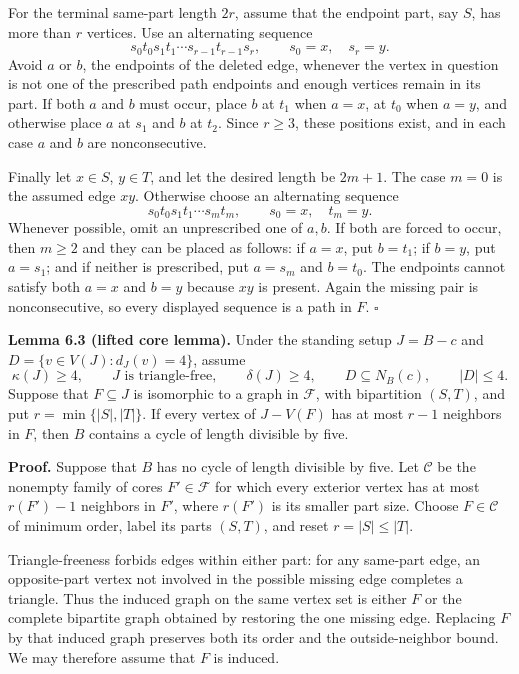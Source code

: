 \documentclass[
  11pt]{article}
\begin{document}
For the terminal same-part length \(2r\), assume that the endpoint part,
say \(S\), has more than \(r\) vertices. Use an alternating sequence \[
 s_0t_0s_1t_1\cdots s_{r-1}t_{r-1}s_r,
 \qquad s_0=x,\quad s_r=y.
\] Avoid \(a\) or \(b\), the endpoints of the deleted edge, whenever the
vertex in question is not one of the prescribed path endpoints and
enough vertices remain in its part. If both \(a\) and \(b\) must occur,
place \(b\) at \(t_1\) when \(a=x\), at \(t_0\) when \(a=y\), and
otherwise place \(a\) at \(s_1\) and \(b\) at \(t_2\). Since \(r\ge3\),
these positions exist, and in each case \(a\) and \(b\) are
nonconsecutive.

Finally let \(x\in S\), \(y\in T\), and let the desired length be
\(2m+1\). The case \(m=0\) is the assumed edge \(xy\). Otherwise choose
an alternating sequence \[
 s_0t_0s_1t_1\cdots s_mt_m,
 \qquad s_0=x,\quad t_m=y.
\] Whenever possible, omit an unprescribed one of \(a,b\). If both are
forced to occur, then \(m\ge2\) and they can be placed as follows: if
\(a=x\), put \(b=t_1\); if \(b=y\), put \(a=s_1\); and if neither is
prescribed, put \(a=s_m\) and \(b=t_0\). The endpoints cannot satisfy
both \(a=x\) and \(b=y\) because \(xy\) is present. Again the missing
pair is nonconsecutive, so every displayed sequence is a path in \(F\).
\(\square\)

\textbf{Lemma 6.3 (lifted core lemma).} Under the standing setup
\(J=B-c\) and \(D=\{v\in V(J):d_J(v)=4\}\), assume \[
 \kappa(J)\ge4,
 \qquad J\text{ is triangle-free},
 \qquad \delta(J)\ge4,
 \qquad D\subseteq N_B(c),
 \qquad |D|\le4.
\] Suppose that \(F\subseteq J\) is isomorphic to a graph in
\(\mathcal F\), with bipartition \((S,T)\), and put
\(r=\min\{|S|,|T|\}\). If every vertex of \(J-V(F)\) has at most \(r-1\)
neighbors in \(F\), then \(B\) contains a cycle of length divisible by
five.

\textbf{Proof.} Suppose that \(B\) has no cycle of length divisible by
five. Let \(\mathcal C\) be the nonempty family of cores
\(F'\in\mathcal F\) for which every exterior vertex has at most
\(r(F')-1\) neighbors in \(F'\), where \(r(F')\) is its smaller part
size. Choose \(F\in\mathcal C\) of minimum order, label its parts
\((S,T)\), and reset \(r=|S|\le|T|\).

Triangle-freeness forbids edges within either part: for any same-part
edge, an opposite-part vertex not involved in the possible missing edge
completes a triangle. Thus the induced graph on the same vertex set is
either \(F\) or the complete bipartite graph obtained by restoring the
one missing edge. Replacing \(F\) by that induced graph preserves both
its order and the outside-neighbor bound. We may therefore assume that
\(F\) is induced.
\end{document}
